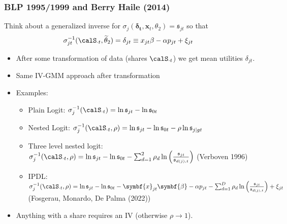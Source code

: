 \begin{frame}
\frametitle{BLP 1995/1999 and Berry Haile (2014)}
Think about a \alert{generalized inverse} for $\sigma_{j}(\symbf{\delta_{t}}, \symbf{x}_t,\theta_2) = \mathfrak{s}_{jt}$ so that 
\begin{align*}
 \sigma_{jt}^{-1}(\calS_{\cdot t},\widetilde{\theta}_2)&= \delta_{jt} \equiv x_{jt} \beta -\alpha p_{jt} +  \xi_{jt} 
\end{align*}
 \begin{itemize}
\item After some transformation of data (shares $\calS_{\cdot t}$) we get \alert{mean utilities} $\delta_{jt}$.
\item Same IV-GMM approach after transformation
\item Examples:
\begin{itemize}
\item Plain Logit: $\sigma_{j}^{-1}(\calS_{\cdot t}) = \ln \mathfrak{s}_{jt}- \ln \mathfrak{s}_{0t}$
\item Nested Logit: $\sigma_{j}^{-1}(\calS_{\cdot t},\rho) = \ln \mathfrak{s}_{jt}- \ln \mathfrak{s}_{0t} - \rho  \ln \mathfrak{s}_{j|gt}$
\item Three level nested logit: $\sigma_{j}^{-1}(\calS_{\cdot t},\rho) = \ln \mathfrak{s}_{jt}- \ln \mathfrak{s}_{0t} -\sum_{d=1}^2 \rho_d \ln \left(\frac{\mathfrak{s}_{jt}}{\mathfrak{s}_{d(j), t}}\right)$ (Verboven 1996)
\item IPDL: $\sigma_{j}^{-1}(\calS_{\cdot t},\rho) = \ln \mathfrak{s}_{jt}- \ln \mathfrak{s}_{0t}-\symbf{x}_{j t} \symbf{\beta}-\alpha p_{j t}-\sum_{d=1}^D \rho_d \ln \left(\frac{\mathfrak{s}_{jt}}{\mathfrak{s}_{d(j), t}}\right)+\xi_{j t}$\\ (Fosgerau, Monardo, De Palma (2022))
 \end{itemize}
 \item Anything with a share requires an IV (otherwise $\rho \rightarrow 1$).
 \end{itemize}
\end{frame}



